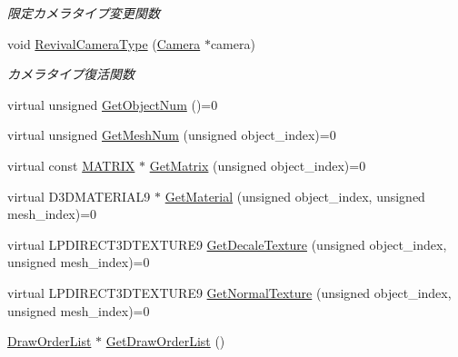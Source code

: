\begin{DoxyCompactItemize}
\begin{DoxyCompactList}\small\item\em 限定カメラタイプ変更関数 \end{DoxyCompactList}\item 
void \mbox{\hyperlink{class_draw_base_a48b144e61928b7658c7a849017e40c79}{Revival\+Camera\+Type}} (\mbox{\hyperlink{class_camera}{Camera}} $\ast$camera)
\begin{DoxyCompactList}\small\item\em カメラタイプ復活関数 \end{DoxyCompactList}\item 
virtual unsigned \mbox{\hyperlink{class_draw_base_aed79e9db49de4fa2dff064495b877bcd}{Get\+Object\+Num}} ()=0
\item 
virtual unsigned \mbox{\hyperlink{class_draw_base_a194eb48924f205d60d4e63c5becdd2fe}{Get\+Mesh\+Num}} (unsigned object\+\_\+index)=0
\item 
virtual const \mbox{\hyperlink{_vector3_d_8h_a032295cd9fb1b711757c90667278e744}{M\+A\+T\+R\+IX}} $\ast$ \mbox{\hyperlink{class_draw_base_a01239bf362040f7f2ef5e5f5371dcf18}{Get\+Matrix}} (unsigned object\+\_\+index)=0
\item 
virtual D3\+D\+M\+A\+T\+E\+R\+I\+A\+L9 $\ast$ \mbox{\hyperlink{class_draw_base_ad82a75dff8e4e2f2ebbec2dd0d0734e5}{Get\+Material}} (unsigned object\+\_\+index, unsigned mesh\+\_\+index)=0
\item 
virtual L\+P\+D\+I\+R\+E\+C\+T3\+D\+T\+E\+X\+T\+U\+R\+E9 \mbox{\hyperlink{class_draw_base_a4e36184dbb605bcae13bfb38722ddc24}{Get\+Decale\+Texture}} (unsigned object\+\_\+index, unsigned mesh\+\_\+index)=0
\item 
virtual L\+P\+D\+I\+R\+E\+C\+T3\+D\+T\+E\+X\+T\+U\+R\+E9 \mbox{\hyperlink{class_draw_base_a87bb54e7f422959e84ac00aa7631bd3b}{Get\+Normal\+Texture}} (unsigned object\+\_\+index, unsigned mesh\+\_\+index)=0
\item 
\mbox{\hyperlink{class_draw_order_list}{Draw\+Order\+List}} $\ast$ \mbox{\hyperlink{class_draw_base_a894bf875b80745150b250e584f00fa0c}{Get\+Draw\+Order\+List}} ()
\end{DoxyCompactItemize}
